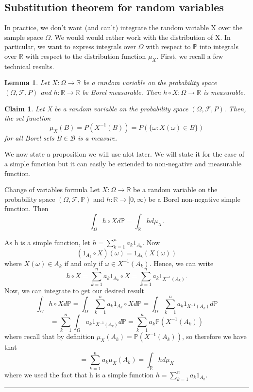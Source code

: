 \documentclass[twoside]{article}
\newtheorem{lemma}[theorem]{Lemma}
\newtheorem{claim}[theorem]{Claim}
\newenvironment{proof}{{\bf Proof:}}{\hfill\rule{2mm}{2mm}}
\newcommand{\sigmalgebra}{\mathcal{F}}
\newcommand{\borelsigmaalgebra}{\mathcal{B}}
\newcommand{\prob}{\mathbb{P}}
\begin{document}
\subsection{Substitution theorem for random variables}
In practice, we don't want (and can't) integrate the random variable X over the sample space $\Omega$. We would would rather work with the distribution of X. In particular, we want to express integrals over $\Omega$ with respect to $\prob$ into integrals over $\mathbb{R}$ with respect to the distribution function $\mu_X.$ First, we recall a few technical results.
\begin{lemma}Let $X: \Omega \rightarrow \mathbb{R}$ be a random variable on the probability space $(\Omega, \sigmalgebra, P)$ and $h: \mathbb{R} \rightarrow \mathbb{R}$ be Borel measurable. Then $h \circ X: \Omega \rightarrow \mathbb{R}$ is measurable.
\end{lemma}

\begin{claim}Let X be a random variable on the probability space $(\Omega, \sigmalgebra, P).$ Then, the set function 
$$
\mu_X(B) = P(X^{-1}(B)) = P(\{\omega: X(\omega) \in B\})
$$
for all Borel sets $B \in \borelsigmaalgebra$ is a measure.
\end{claim}

We now state a proposition we will use alot later. We will state it for the case of a simple function but it can easily be extended to non-negative and measurable function.
\begin{proposition_exam}{Change of variables formula}{} Let $X: \Omega \rightarrow \mathbb{R}$ be a random variable on the probability space $(\Omega, \sigmalgebra, \prob)$ and $h: \mathbb{R} \rightarrow [0,\infty)$ be a Borel non-negative simple function. Then 
$$
\int_{\Omega}h\circ Xd\prob = \int_{\mathbb{R}}hd\mu_X.
$$
\end{proposition_exam}

\begin{proof} As h is a simple function, let $h = \sum_{k=1}^{n}a_k1_{A_{k}}.$ Now 
$$
(1_{A_{k}} \circ X)(\omega) = 1_{A_{k}}(X(\omega))
$$
where $X(\omega) \in A_k$ if and only if $\omega \in X^{-1}(A_k).$ Hence, we can write 
$$
h \circ X = \sum_{k=1}^{n}a_k1_{A_{k}}\circ X = \sum_{k=1}^{n}a_k1_{X^{-1}(A_{k})}.
$$
Now, we can integrate to get our desired result 
$$
\int_{\Omega}h \circ Xd\prob = \int_{\Omega}\sum_{k=1}^{n}a_k1_{A_{k}}\circ Xd\prob = \int_{\Omega}\sum_{k=1}^{n}a_k1_{X^{-1}(A_k)}d\prob
$$
$$
= \sum_{k=1}^{n}\int_{\Omega}a_k1_{X^{-1}(A_k)}d\prob = \sum_{k=1}^{n}a_k \prob(X^{-1}(A_k))
$$
where recall that by definition $\mu_X(A_k) = \prob(X^{-1}(A_k))$, so therefore we have that
$$
= \sum_{k=1}^{n}a_k\mu_{X}(A_k) = \int_{\mathbb{R}}hd\mu_X
$$
where we used the fact that h is a simple function $h = \sum_{k=1}^{n}a_k1_{A_{k}}.$
\end{proof}
\end{document}
